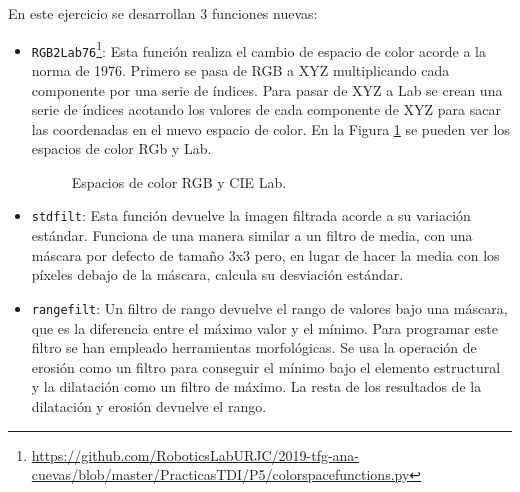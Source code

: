 En este ejercicio se desarrollan 3 funciones nuevas:
\begin{itemize}

	\item \texttt{RGB2Lab76}\footnote{\url{https://github.com/RoboticsLabURJC/2019-tfg-ana-cuevas/blob/master/PracticasTDI/P5/colorspacefunctions.py}}: Esta función realiza el cambio de espacio de color acorde a la norma de 1976. Primero se pasa de RGB a XYZ multiplicando cada componente por una serie de índices. Para pasar de XYZ a Lab se crean una serie de índices acotando los valores de cada componente de XYZ para sacar las coordenadas en el nuevo espacio de color. En la Figura \ref{colorspaces} se pueden ver los espacios de color RGb y Lab.
\begin{figure}[!tbp]
  \centering
  \hfill
  \caption{Espacios de color RGB y CIE Lab.}
  \label{colorspaces}
\end{figure}

	\item \texttt{stdfilt}: Esta función devuelve la imagen filtrada acorde a su variación estándar. Funciona de una manera similar a un filtro de media, con una máscara por defecto de tamaño 3x3 pero, en lugar de hacer la media con los píxeles debajo de la máscara, calcula su desviación estándar.

	\item \texttt{rangefilt}: Un filtro de rango devuelve el rango de valores bajo una máscara, que es la diferencia entre el máximo valor y el mínimo. Para programar este filtro se han empleado herramientas morfológicas. Se usa la operación de erosión como un filtro para conseguir el mínimo bajo el elemento estructural y la dilatación como un filtro de máximo. La resta de los resultados de la dilatación y erosión devuelve el rango.\\
\end{itemize}

